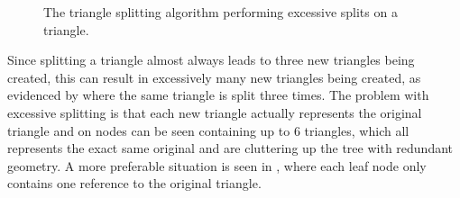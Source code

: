 \begin{figure}
  \centering

  \vspace{3mm}
  \parbox{8cm}{\caption[Excessive splitting of a triangle.]{The triangle splitting
      algorithm performing excessive splits on a triangle.}\label{fig:excessiveSplitting}}
\end{figure}

Since splitting a triangle almost always leads to three new triangles being
created, this can result in excessively many new triangles being created, as
evidenced by  where the same triangle is split
three times. The problem with excessive splitting is that each new triangle
actually represents the original triangle and on 
nodes can be seen containing up to 6 triangles, which all represents the exact
same original and are cluttering up the tree with redundant geometry. A more
preferable situation is seen in , where each leaf node only
contains one reference to the original triangle.

